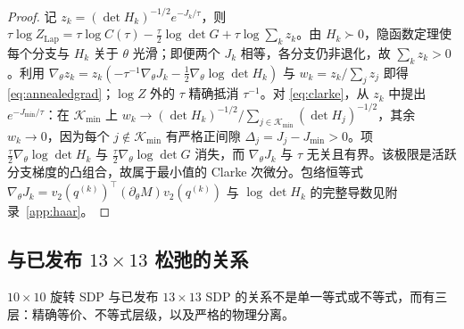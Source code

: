 \begin{proof}
记 $z_k=(\det H_k)^{-1/2}e^{-J_k/\tau}$，则 $\tau\log Z_{\mathrm{Lap}}=\tau\log C(\tau)-\frac{\tau}{2}\log\det G+\tau\log\sum_kz_k$。由 $H_k\succ0$，隐函数定理使每个分支与 $H_k$ 关于 $\theta$ 光滑；即便两个 $J_k$ 相等，各分支仍非退化，故 $\sum_kz_k>0$。利用 $\nabla_\theta z_k=z_k(-\tau^{-1}\nabla_\theta J_k-\frac12\nabla_\theta\log\det H_k)$ 与 $w_k=z_k/\sum_jz_j$ 即得 \eqref{eq:annealedgrad}；$\log Z$ 外的 $\tau$ 精确抵消 $\tau^{-1}$。对 \eqref{eq:clarke}，从 $z_k$ 中提出 $e^{-J_{\min}/\tau}$：在 $\mathcal{K}_{\min}$ 上 $w_k\to(\det H_k)^{-1/2}/\sum_{j\in\mathcal{K}_{\min}}(\det H_j)^{-1/2}$，其余 $w_k\to0$，因为每个 $j\notin\mathcal{K}_{\min}$ 有严格正间隙 $\Delta_j=J_j-J_{\min}>0$。项 $\frac{\tau}{2}\nabla_\theta\log\det H_k$ 与 $\frac{\tau}{2}\nabla_\theta\log\det G$ 消失，而 $\nabla_\theta J_k$ 与 $\tau$ 无关且有界。该极限是活跃分支梯度的凸组合，故属于最小值的 Clarke 次微分。包络恒等式 $\nabla_\theta J_k=v_2(q^{(k)})^\top(\partial_\theta M)v_2(q^{(k)})$ 与 $\log\det H_k$ 的完整导数见附录~\ref{app:haar}。
\end{proof}

\subsection{与已发布 \texorpdfstring{$13\times13$}{13x13} 松弛的关系}\label{sec:thirteen}

$10\times10$ 旋转 SDP 与已发布 $13\times13$ SDP 的关系不是单一等式或不等式，而有三层：精确等价、不等式层级，以及严格的物理分离。

